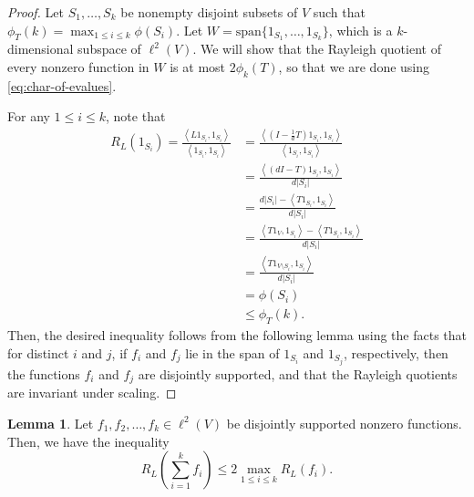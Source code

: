 \documentclass[12pt,a4paper,bold]{thesis}
\theoremstyle{definition}
\newtheorem{lemma}[thm]{Lemma}
\newcommand*{\ip}[2]{\left\langle #1 , #2 \right\rangle}
\begin{document}
\begin{proof}
    Let $S_1, \dots, S_k$ be nonempty disjoint subsets of $V$ such that $\phi_T(k) 
    = \max_{1 \leq i \leq k} \phi(S_i)$. Let $W = \text{span}\{1_{S_1}, \dots, 1_{S_k}\}$, 
    which is a $k$-dimensional subspace of $\ell^2(V)$. We will show that the Rayleigh
    quotient of every nonzero function in $W$ is at most $2 \phi_k(T)$, so that
    we are done using \cref{eq:char-of-evalues}. 
    
    For any $1 \leq i \leq k$, note that
    \begin{align*}
        R_L(1_{S_i}) = \frac{\ip{L1_{S_i}}{1_{S_i}}}{\ip{1_{S_i}}{1_{S_i}}} 
        & = 
        \frac{\ip{\left(I - \frac{1}{d}T \right)1_{S_i}}{1_{S_i}}}{\ip{1_{S_i}}{1_{S_i}}} 
        \\
        & = 
        \frac{\ip{(dI - T)1_{S_i}}{1_{S_i}}}{d|S_i|} 
        \\ 
        & = 
        \frac{d|S_i| - \ip{T1_{S_i}}{1_{S_i}}}{d|S_i|}
        \\
        & =
        \frac{\ip{T1_V}{1_{S_i}} - \ip{T1_{S_i}}{1_{S_i}}}{d|S_i|}
        \\
        & =
        \frac{\ip{T1_{V \setminus S_i}}{1_{S_i}}}{d|S_i|}
        \\
        & =
        \phi(S_i)
        \\
        & \leq 
        \phi_T(k).
    \end{align*}
    Then, the desired inequality follows from the following lemma using the facts
    that for distinct $i$ and $j$, if $f_i$ and $f_j$ lie in the span of $1_{S_i}$ 
    and $1_{S_j}$, respectively, then the functions $f_i$ and $f_j$ are disjointly supported,
    and that the Rayleigh quotients are invariant under scaling.
\end{proof}

\begin{lemma}
    Let $f_1, f_2, \dots, f_k \in \ell^2(V)$ be disjointly supported nonzero functions.
    Then, we have the inequality
    \begin{equation*}
        R_L \left(\sum_{i=1}^{k} f_i\right) \leq 2 \max_{1 \leq i \leq k} R_L(f_i).
    \end{equation*}
\end{lemma}
\end{document}
